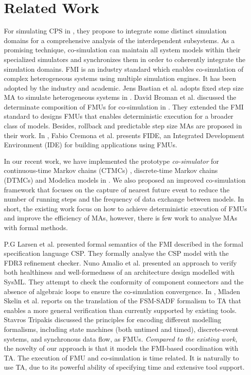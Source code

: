 \section{Related Work}
\label{sec:relateworks}
For simulating CPS in \cite{GeorgMRW14}, they propose to integrate some distinct simulation domains for a comprehensive analysis of the interdependent subsystems. As a promising technique, co-simulation \cite{Bogomolov2015Co} can maintain all system models within their specialized simulators
and synchronizes them in order to coherently integrate the simulation domains. FMI \cite{Blochwitz2011The}\cite{FMI2INTRO} is an industry standard which enables co-simulation of complex heterogeneous systems using multiple simulation engines. It has been adopted by the industry and academic. Jens Bastian et al. adopts fixed step size MA to simulate heterogeneous systems in \cite{Bastian2011Master}.
David Broman et al. discussed the determinate composition of FMUs for co-simulation in \cite{BromanBGLMTW13}. They extended the FMI standard to designs FMUs that enables deterministic execution for a broader class of models. Besides, rollback and predictable step size MAs are proposed in their work. In \cite{CremonaLTBL16}, Fabio Cremona et al. presents FIDE, an Integrated Development Environment
(IDE) for building applications using FMUs. 

In our recent work, we have implemented the prototype \textit{co-simulator} for continuous-time Markov chains (CTMCs) \cite{DanosHGS17}, discrete-time Markov chains (DTMCs) \cite{Guerry13} and Modelica models in \cite{LiuJWCD16}. We also proposed an improved co-simulation framework that focuses on the capture of nearest future event to reduce the number of running steps and the frequency of data exchange between models. In short, the existing work focus on how to achieve deterministic execution of FMUs and improve the efficiency of MAs, however, there is few work to analyse MAs with formal methods.

P.G Larsen et al. \cite{Larsen2016Integrated} presented formal semantics of the FMI described in the formal specification language CSP. They 
formally analyse the CSP model with the FDR3 refinement checker. Nuno Amalio et al. \cite{AmalioPCW16} presented an approach to verify both healthiness and well-formedness of an architecture design modelled with SysML. They attempt to check the conformity of component connectors and the absence of algebraic loops to ensure the co-simulation convergence.
In \cite{SkelinWOHL15}, Mladen Skelin et al. reports on the translation of the FSM-SADF formalism to TA that enables a more general
verification than currently supported by existing tools. Stavros Tripakis \cite{Tripakis15} discussed the principles for encoding different modelling formalisms, including state machines (both untimed and timed), discrete-event systems, and synchronous data flow, as FMUs. 
\emph{Compared to the existing work}, the novelty of our approach is that it models the FMI-based coordination with TA. The execution of FMU and co-simulation is time related. It is naturally to use TA, due to its powerful ability of specifying time and extensive tool support.


